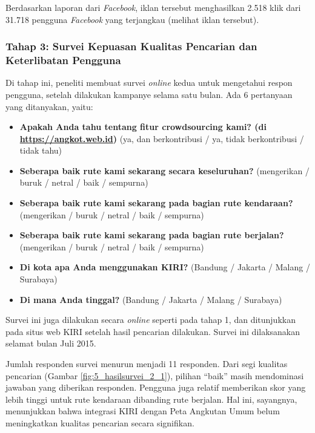 Berdasarkan laporan dari \textit{Facebook}, iklan tersebut menghasilkan 2.518 klik dari 31.718 pengguna \textit{Facebook} yang terjangkau (melihat iklan tersebut).

\subsubsection{Tahap 3: Survei Kepuasan Kualitas Pencarian dan Keterlibatan Pengguna}

Di tahap ini, peneliti membuat survei \textit{online} kedua untuk mengetahui respon pengguna, setelah dilakukan kampanye selama satu bulan. Ada 6 pertanyaan yang ditanyakan, yaitu:

\begin{itemize}
	\item \textbf{Apakah Anda tahu tentang fitur crowdsourcing kami? (di \url{https://angkot.web.id})} (ya, dan berkontribusi / ya, tidak berkontribusi / tidak tahu)
	\item \textbf{Seberapa baik rute kami sekarang secara keseluruhan?} (mengerikan / buruk / netral / baik / sempurna)
	\item \textbf{Seberapa baik rute kami sekarang pada bagian rute kendaraan?} (mengerikan / buruk / netral / baik / sempurna)
	\item \textbf{Seberapa baik rute kami sekarang pada bagian rute berjalan?} (mengerikan / buruk / netral / baik / sempurna)
	\item \textbf{Di kota apa Anda menggunakan KIRI?} (Bandung / Jakarta / Malang / Surabaya)
	\item \textbf{Di mana Anda tinggal?} (Bandung / Jakarta / Malang / Surabaya)
\end{itemize}

Survei ini juga dilakukan secara \textit{online} seperti pada tahap 1, dan ditunjukkan pada situs web KIRI setelah hasil pencarian dilakukan. Survei ini dilaksanakan selamat bulan Juli 2015.

Jumlah responden survei menurun menjadi 11 responden. Dari segi kualitas pencarian (Gambar \ref{fig:5_hasilsurvei_2_1}), pilihan ``baik'' masih mendominasi jawaban yang diberikan responden. Pengguna juga relatif memberikan skor yang lebih tinggi untuk rute kendaraan dibanding rute berjalan. Hal ini, sayangnya, menunjukkan bahwa integrasi KIRI dengan Peta Angkutan Umum belum meningkatkan kualitas pencarian secara signifikan.

